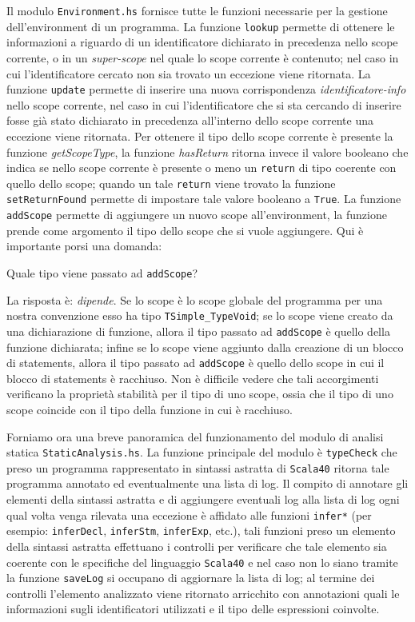 Il modulo \texttt{Environment.hs} fornisce tutte le funzioni necessarie per la gestione dell'environment di un programma. La funzione \texttt{lookup}  permette di ottenere le informazioni a riguardo di un identificatore dichiarato in precedenza nello scope corrente, o in un \textit{super-scope} nel quale lo scope corrente è contenuto; nel caso in cui l'identificatore cercato non sia trovato un eccezione viene ritornata.
La funzione \texttt{update} permette di inserire una nuova corrispondenza \textit{identificatore-info} nello scope corrente, nel caso in cui l'identificatore che si sta cercando di inserire fosse già stato dichiarato in precedenza all'interno dello scope corrente una eccezione viene ritornata.
Per ottenere il tipo dello scope corrente è presente la funzione \textit{getScopeType}, la funzione \textit{hasReturn} ritorna invece il valore booleano che indica se nello scope corrente è presente o meno un \texttt{return} di tipo coerente con quello dello scope; quando un tale \texttt{return} viene trovato la funzione \texttt{setReturnFound} permette di impostare tale valore booleano a \texttt{True}.
La funzione \texttt{addScope} permette di aggiungere un nuovo scope all'environment, la funzione prende come argomento il tipo dello scope che si vuole aggiungere. Qui è importante porsi una domanda:
\begin{center}
Quale tipo viene passato ad \texttt{addScope}?
\end{center}
La risposta è: \textit{dipende}. 
Se lo scope è lo scope globale del programma per una nostra convenzione esso ha tipo \texttt{TSimple\_TypeVoid}; se lo scope viene creato da una dichiarazione di funzione, allora il tipo passato ad \texttt{addScope} è quello della funzione dichiarata; infine se lo scope viene aggiunto dalla creazione di un blocco di statements, allora il tipo passato ad \texttt{addScope} è quello dello scope in cui il blocco di statements è racchiuso.
Non è difficile vedere che tali accorgimenti verificano la proprietà stabilità per il tipo di uno scope, ossia che il tipo di uno scope coincide con il tipo della funzione in cui è racchiuso.

Forniamo ora una breve panoramica del funzionamento del modulo di analisi statica \texttt{StaticAnalysis.hs}. La funzione principale del modulo è \texttt{typeCheck} che preso un programma rappresentato in sintassi astratta di \texttt{Scala40} ritorna tale programma annotato ed eventualmente una lista di log.
Il compito di annotare gli elementi della sintassi astratta e di aggiungere eventuali log alla lista di log ogni qual volta venga rilevata una eccezione è affidato alle funzioni \texttt{infer*} (per esempio: \texttt{inferDecl}, \texttt{inferStm}, \texttt{inferExp}, etc.), tali funzioni preso un elemento della sintassi astratta effettuano i controlli per verificare che tale elemento sia coerente con le specifiche del linguaggio \texttt{Scala40} e nel caso non lo siano tramite la funzione \texttt{saveLog} si occupano di aggiornare la lista di log; al termine dei controlli l'elemento analizzato viene ritornato arricchito con annotazioni quali le informazioni sugli identificatori utilizzati e il tipo delle espressioni coinvolte. 

